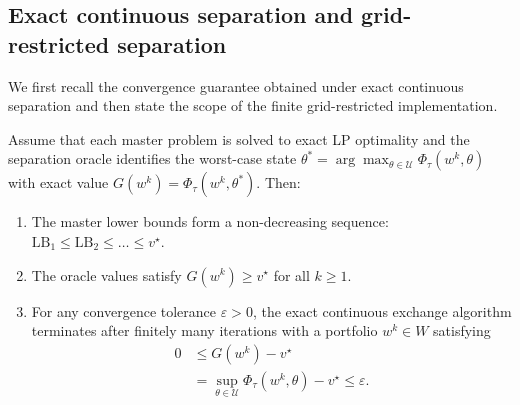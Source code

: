 \documentclass[smallextended]{svjour3}
\begin{document}
\subsection{Exact continuous separation and grid-restricted separation}
We first recall the convergence guarantee obtained under exact continuous separation and then state the scope of the finite grid-restricted implementation.

\begin{proposition}
Assume that each master problem is solved to exact LP optimality and the separation oracle identifies the worst-case state $\theta^* = \arg\max_{\theta \in \mathcal{U}} \Phi_\tau(w^k, \theta)$ with exact value $G(w^k) = \Phi_\tau(w^k, \theta^*)$. Then:
\begin{enumerate}
    \item The master lower bounds form a non-decreasing sequence: $\mathrm{LB}_1 \le \mathrm{LB}_2 \le \dots \le v^\star$.
    \item The oracle values satisfy $G(w^k)\ge v^\star$ for all $k\ge1$.
    \item For any convergence tolerance $\varepsilon>0$, the exact continuous exchange algorithm terminates after finitely many iterations with a portfolio $w^k\in W$ satisfying
    \begin{equation}
    \begin{split}
        0 &\le G(w^k)-v^\star \\
        &= \sup_{\theta\in\mathcal U}\Phi_\tau(w^k,\theta)-v^\star \le \varepsilon.
    \end{split}
    \end{equation}
\end{enumerate}
\end{proposition}
\end{document}

